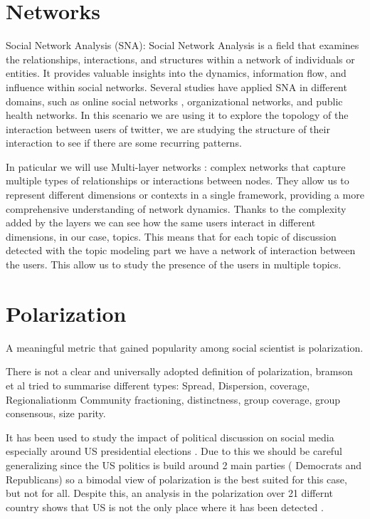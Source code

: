 \section[Networks]{Networks}
Social Network Analysis (SNA): Social Network Analysis is a field that examines the relationships, interactions, and structures within a network of individuals or entities. It provides valuable insights into the dynamics, information flow, and influence within social networks. Several studies have applied SNA in different domains, such as online social networks \cite{borgatti_network_2009}, organizational networks, and public health networks. In this scenario we are using it to explore the topology of the interaction between users of twitter, we are studying the structure of their interaction  to see if there are some recurring patterns.

In paticular we will use Multi-layer networks \cite{kivela_multilayer_2014}:  complex networks that capture multiple types of relationships or interactions between nodes. They allow us to represent different dimensions or contexts in a single framework, providing a more comprehensive understanding of network dynamics. Thanks to the complexity added by the layers we can see how the same users interact in different dimensions, in our case, topics. This means that for each topic of discussion detected with the topic modeling part we have a network of interaction between the users. This allow us to study the presence of the users in multiple topics.


\section[Polarization]{Polarization}
A meaningful metric that gained popularity among social scientist is polarization.

There is not a clear and universally adopted definition of polarization, bramson et al \cite{bramson_understanding_2017} tried to summarise different types: Spread, Dispersion, coverage, Regionaliationm Community fractioning, distinctness, group coverage, group consensous, size parity.

It has been used to study the impact of political discussion on social media especially around US presidential elections \cite{conover_political_2011}
\cite{flamino_shifting_2021} . Due to this we should be careful generalizing since the US politics is build around 2 main parties ( Democrats and Republicans) so a bimodal view of polarization is the best suited for this case, but not for all.  Despite this, an analysis in the polarization over 21 differnt country shows that US is not the only place where it has been detected  \cite{gidron_toward_2019}.

